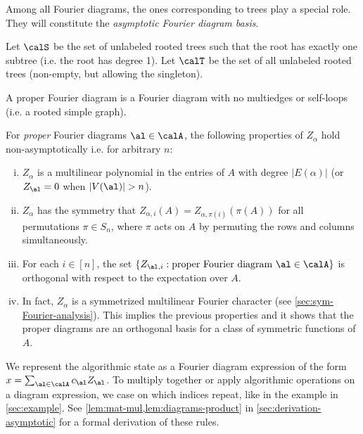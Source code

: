 \documentclass[12pt]{article}
\begin{document}
Among all Fourier diagrams, the ones corresponding to trees play a special role. They will constitute the \textit{asymptotic Fourier diagram basis}.

\begin{definition}
    \label{def:diagram-notations}
    Let $\calS$ be the set of unlabeled rooted trees such
    that the root has exactly one subtree (i.e. the root has degree 1).
    Let $\calT$ be the set of all unlabeled rooted trees (non-empty, but allowing the singleton).
\end{definition}

\begin{definition}
    A proper Fourier diagram is a Fourier diagram with no multiedges or self-loops (i.e. a rooted simple graph).
\end{definition}

For \emph{proper} Fourier diagrams $\al \in \calA$, the following properties of $Z_\alpha$
hold non-asymptotically i.e. for arbitrary $n$: 
\begin{enumerate}[(i)]
    \item $Z_\alpha$ is a multilinear polynomial in the entries of $A$
    with degree $|E(\alpha)|$ (or $Z_\al = 0$ when $|V(\al)| > n$).
    \item 
    $Z_\alpha$ has the symmetry that $Z_{\alpha,i}(A) = Z_{\alpha, \pi(i)}(\pi(A))$ for all permutations $\pi \in S_n$, where $\pi$ acts on $A$ by permuting the rows and columns simultaneously.
    \item 
    For each $i \in [n]$, the 
    set $\{Z_{\al, i}:\text{proper Fourier diagram }\al \in \calA\}$
    is orthogonal
    with respect to the expectation over $A$. 
    \item In fact, $Z_\alpha$ is a symmetrized
    multilinear Fourier character (see \cref{sec:sym-Fourier-analysis}). This implies the previous properties and it shows that
    the proper diagrams are an orthogonal basis for a class of
    symmetric functions of $A$. 
\end{enumerate}

We represent the algorithmic state as a Fourier diagram expression of the form $x = \sum_{\al \in \calA} c_\al Z_\al$.
To multiply together or apply algorithmic operations on a diagram expression, we case on
which indices repeat, like in the example in \cref{sec:example}.
See \cref{lem:mat-mul,lem:diagrams-product} in \cref{sec:derivation-asymptotic} for a formal derivation of these rules.
\end{document}
